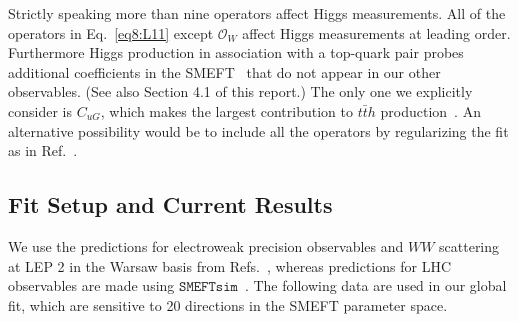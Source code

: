 \documentclass[../report.tex]{subfiles}
\begin{document}
Strictly speaking more than nine operators affect Higgs measurements.
All of the operators in Eq.~\eqref{eq8:L11} except $\mathcal{O}_W$ affect Higgs measurements at leading order.
Furthermore Higgs production in association with a top-quark pair probes additional coefficients in the SMEFT~\cite{AguilarSaavedra:2018nen, Ellis:2018gqa} that do not appear in our other observables.
(See also Section 4.1 of this report.)
The only one we explicitly consider is $C_{uG}$, which makes the largest contribution to $t \bar{t} h$ production~\cite{Ellis:2018gqa}. 
An alternative possibility would be to include all the operators by regularizing the fit as in Ref.~\cite{Murphy:2017omb}.
\subsection{Fit Setup and Current Results}
\label{sec8:fit}
We use the predictions for electroweak precision observables and $WW$ scattering at LEP 2 in the Warsaw basis from Refs.~\cite{Berthier:2016tkq, Brivio:2017vri}, whereas predictions for LHC observables are made using $\mathtt{SMEFTsim}$~\cite{Brivio:2017btx}.
The following data are used in our global fit, which are sensitive to 20 directions in the SMEFT parameter space.
\end{document}
